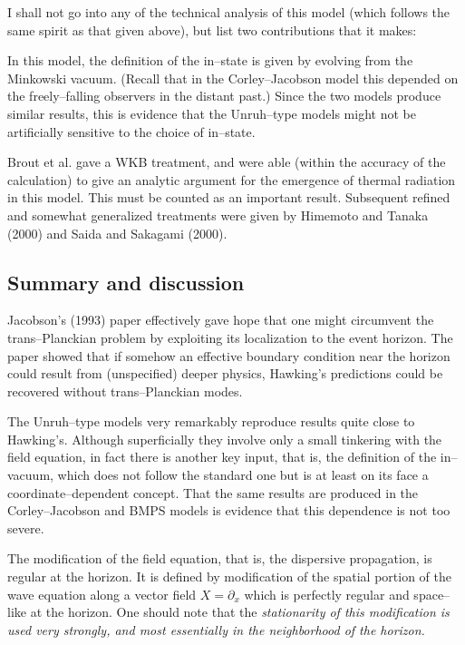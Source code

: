 I shall not go into any of the technical analysis of this model (which follows
the same spirit as that given above), but list two contributions that it makes:

In this model, the definition of the in--state is given by evolving from the
Minkowski vacuum.  (Recall that in the Corley--Jacobson model this depended on
the freely--falling observers in the distant past.)  Since the two models
produce similar results, this is evidence that the Unruh--type models might not
be artificially sensitive to the choice of in--state.

Brout et al. gave a WKB treatment, and were able (within the accuracy of the
calculation) to give an analytic argument for the emergence of thermal
radiation in this model.  This must be counted as an important result.
Subsequent refined and somewhat
generalized treatments were given by Himemoto and Tanaka
(2000) and Saida and Sakagami (2000).  


\subsection{Summary and discussion}

Jacobson's (1993) paper effectively gave hope that one might 
circumvent the trans--Planckian problem by 
exploiting its
localization to the event horizon.  The paper showed that if somehow an
effective boundary condition near the horizon could result from (unspecified)
deeper physics, Hawking's predictions could be recovered without
trans--Planckian modes.

The Unruh--type models very remarkably reproduce results quite close to
Hawking's.  Although superficially they involve only a small tinkering with the
field equation, in fact there is another key input, that is, the definition of
the in--vacuum, which does not follow the standard one but is at least on its
face a coordinate--dependent concept.  That the same results are produced in
the Corley--Jacobson and BMPS models is evidence that this dependence is not
too severe.

The modification of the field equation, that is, the dispersive propagation, is
regular  at the horizon.  It is defined by modification of the spatial portion
of the wave equation along a vector field $X=\partial _x$ which is perfectly
regular and space--like at the horizon.   One should note that the \it
stationarity \rm of this modification is used very strongly, and most
essentially in the neighborhood of the horizon.

